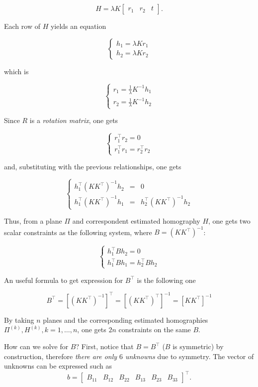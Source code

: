 \documentclass[10pt]{report}
\begin{document}
\[H = \lambda K \begin{bmatrix} r_1 & r_2 & t \end{bmatrix}.\]

Each row of \(H\) yields an equation

\[ \left\{\begin{array}{ll} h_1 = \lambda K r_1\\ h_2 = \lambda K r_2 \end{array}\right. \]

which is

\[ \left\{\begin{array}{ll} r_1 = \frac{1}{\lambda} K^{-1} h_1\\ r_2 = \frac{1}{\lambda} K^{-1} h_2 \end{array}\right. \]

Since \(R\) is a \emph{rotation matrix}, one gets

\[ \left\{\begin{array}{ll} r_1^\top r_2 = 0\\ r_1^\top r_1 = r_2^\top r_2 \end{array} \right. \]

and, substituting with the previous relationships, one gets

$$ \left\{\begin{array}{lll}h_1^\top(KK^\top)^{-1}h_2 & = & 0 \\ h_1^\top(KK^\top)^{-1}h_1 & = & h_2^\top(KK^\top)^{-1}h_2\end{array}\right. $$

Thus, from a plane \(\Pi\) and correspondent estimated homography \(H\),
one gets two scalar constraints as the following system, where \(B = (KK^\top)^{-1}\):

\[ \left\{\begin{array}{ll} h_1^\top B h_2 = 0\\ h_1^\top B h_1 = h_2^\top B h_2 \end{array}\right. \]

An useful formula to get expression for \(B^\top\) is the following one

\[B^\top = [(K K^\top)^{-1}]^\top = [(KK^\top)^\top]^{-1} = [KK^\top]^{-1}\]

By taking \(n\) planes and the corresponding estimated homographies \(\Pi^{(k)}, H^{(k)}, k=1,\dots,n\), one gets \(2n\) constraints on the same \(B\).

How can we solve for \(B\)? First, notice that \(B = B^\top\) (\(B\) is symmetric) by construction, therefore \emph{there are only \(6\) unknowns} due to symmetry. The vector of unknowns can be expressed such as $$b = \begin{bmatrix} B_{11} & B_{12} & B_{22} & B_{13} & B_{23} & B_{33}\end{bmatrix}^\top.$$
\end{document}
